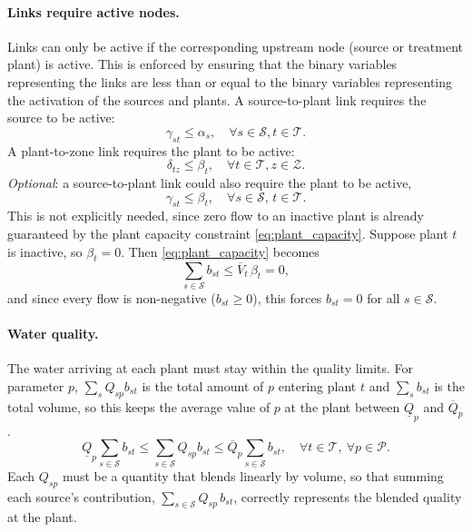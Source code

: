 \documentclass[10pt]{article}
\begin{document}
\paragraph{Links require active nodes.} Links can only be active if the corresponding upstream node (source or treatment plant) is active.
This is enforced by ensuring that the binary variables representing the links are less than or equal to the binary variables representing the activation of the sources and plants.
A source-to-plant link requires the source to be active:
\begin{equation}
    \gamma_{st} \le \alpha_s, \quad \forall s \in \mathcal{S}, t \in \mathcal{T}.
\end{equation}
A plant-to-zone link requires the plant to be active:
\begin{equation}
    \delta_{tz} \le \beta_t,  \quad \forall t \in \mathcal{T}, z \in \mathcal{Z}.
\end{equation}
\emph{Optional}: a source-to-plant link could also require the plant to be active,
\begin{equation}
    \gamma_{st} \le \beta_t, \quad \forall s \in \mathcal{S},\, t \in \mathcal{T}.
\end{equation}
This is not explicitly needed, since zero flow to an inactive plant is already guaranteed by the plant capacity constraint \eqref{eq:plant_capacity}.
Suppose plant $t$ is inactive, so $\beta_t = 0$. Then \eqref{eq:plant_capacity} becomes
\begin{equation*}
    \sum_{s \in \mathcal{S}} b_{st} \le \overline{V}_t\,\beta_t = 0,
\end{equation*}
and since every flow is non-negative ($b_{st} \ge 0$), this forces $b_{st} = 0$ for all $s \in \mathcal{S}$.


\paragraph{Water quality.} The water arriving at each plant must stay within the quality limits.
For parameter $p$, $\sum_s Q_{sp} b_{st}$ is the total amount of $p$ entering plant $t$ and $\sum_s b_{st}$ is the total volume, so this keeps the average value of $p$ at the plant between $\underline{Q}_p$ and $\overline{Q}_p$.
\begin{equation}
    \underline{Q}_p \sum_{s \in \mathcal{S}} b_{st}
    \le \sum_{s \in \mathcal{S}} Q_{sp}b_{st}
    \le \overline{Q}_p \sum_{s \in \mathcal{S}} b_{st},
    \quad \forall t \in \mathcal{T},\ \forall p \in \mathcal{P}.
\end{equation}
Each $Q_{sp}$ must be a quantity that blends linearly by volume, so that summing each source's contribution, $\sum_{s \in \mathcal{S}} Q_{sp}\,b_{st}$, correctly represents the blended quality at the plant.
\end{document}
